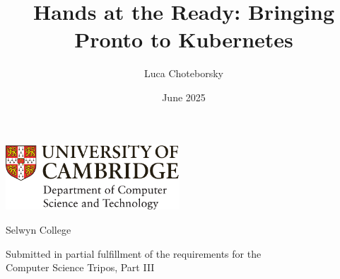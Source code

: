 \documentclass[12pt,a4paper,twoside]{report}
\title{Hands at the Ready: Bringing Pronto to Kubernetes}
\author{Luca Choteborsky}
\date{June 2025}
\newif\ifsubmission %
\newcommand{\candidatenumber}{1234N}
\newcommand{\college}{Selwyn College}
\newcommand{\coursethe}{Computer Science Tripos, Part III}
\begin{document}
\begin{sffamily} %

\begin{titlepage}
\makeatletter

\hspace*{-14mm}\includegraphics[width=65mm]{logo-dcst-colour}

\ifsubmission

\begin{Large}
\vspace{20mm}
Research project report title page

\vspace{35mm}
Candidate \candidatenumber

\vspace{42mm}
\textsl{``\@title''}

\end{Large}

\else

\begin{center}
\Huge
\vspace{\fill}

\@title
\vspace{\fill}

\@author
\vspace{10mm}

\Large
\college
\vspace{\fill}

\@date
\vspace{\fill}

\end{center}

\fi

\vspace{\fill}
\begin{center}
Submitted in partial fulfillment of the requirements for the\\
\coursethe
\end{center}

\makeatother
\end{titlepage}

\newpage


\end{sffamily}
\end{document}
